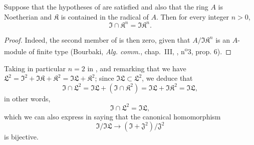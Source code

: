 \begin{corollary}[16.9.13.5]
\label{IV.16.9.13.5}
Suppose that the hypotheses of  are satisfied and also that the ring $A$ is Noetherian and $\mathfrak{K}$ is contained in the radical of $A$.
Then for every integer $n > 0$,
\[
  \label{IV.16.9.13.6}
  \mathfrak{I} \cap \mathfrak{K}^n = \mathfrak{I}\mathfrak{K}^n.
  \tag{16.9.13.6}
\]
\end{corollary}

\begin{proof}
Indeed, the second member of  is then zero, given that $A/\mathfrak{I}\mathfrak{K}^n$ is an $A$-module of finite type (Bourbaki, \emph{Alg. comm.}, chap.~III, , n\textsuperscript{o}3, prop. 6).
\end{proof}

Taking in particular $n = 2$ in , and remarking that we have $\mathfrak{L}^2 = \mathfrak{I}^2 + \mathfrak{I}\mathfrak{K} + \mathfrak{K}^2 = \mathfrak{I}\mathfrak{L} + \mathfrak{K}^2$;
since $\mathfrak{I}\mathfrak{L} \subset \mathfrak{L}^2$, we deduce that
\[
  \mathfrak{I} \cap \mathfrak{L}^2 = \mathfrak{I}\mathfrak{L} + (\mathfrak{I} \cap \mathfrak{K}^2) = \mathfrak{I}\mathfrak{L} + \mathfrak{I}\mathfrak{K}^2 = \mathfrak{I}\mathfrak{L},
\]
in other words, 
\[
  \label{IV.16.9.13.7}
  \mathfrak{I} \cap \mathfrak{L}^2 = \mathfrak{I}\mathfrak{L},
  \tag{16.9.13.7}
\]
which we can also express in saying that the canonical homomorphism
\[
  \mathfrak{I}/\mathfrak{I}\mathfrak{L} \to (\mathfrak{I} + \mathfrak{J}^2)/\mathfrak{J}^2
\]
is bijective.

